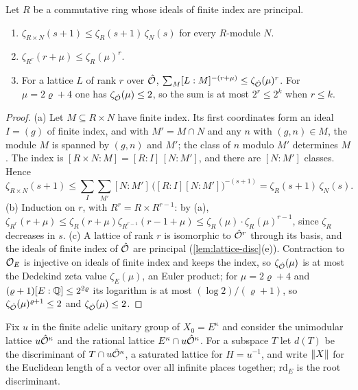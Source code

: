 \begin{lemma}\label{lem:sublattice-zeta}
Let $R$ be a commutative ring whose ideals of finite index are principal.
\begin{enumerate}[label=\textup{(\alph*)}]
\item $\zeta_{R\times N}(s+1)\le\zeta_R(s+1)\,\zeta_N(s)$ for every $R$-module $N$.
\item $\zeta_{R^r}(r+\mu)\le\zeta_R(\mu)^r$.
\item For a lattice $L$ of rank $r$ over $\hat{\mathcal{O}}$, $\sum_M[L:M]^{-(r+\mu)}\le\zeta_{\hat{\mathcal{O}}}(\mu)^r$. For $\mu=2\varrho+4$ one has $\zeta_{\hat{\mathcal{O}}}(\mu)\le2$, so the sum is at most $2^r\le2^k$ when $r\le k$.
\end{enumerate}
\end{lemma}

\begin{proof}
(a) Let $M\subseteq R\times N$ have finite index. Its first coordinates form an ideal $I=(g)$ of finite index, and with $M'=M\cap N$ and any $n$ with $(g,n)\in M$, the module $M$ is spanned by $(g,n)$
and $M'$; the class of $n$ modulo $M'$ determines $M$. The index is $[R\times N:M]=[R:I]\,[N:M']$, and there are $[N:M']$ classes. Hence
\[
  \zeta_{R\times N}(s+1)\le\sum_I\sum_{M'}[N:M']\,\bigl([R:I][N:M']\bigr)^{-(s+1)}=\zeta_R(s+1)\,\zeta_N(s).
\]
(b) Induction on $r$, with $R^r=R\times R^{r-1}$: by (a), $\zeta_{R^r}(r+\mu)\le\zeta_R(r+\mu)\zeta_{R^{r-1}}(r-1+\mu)\le\zeta_R(\mu)\cdot\zeta_R(\mu)^{r-1}$, since $\zeta_R$ decreases in $s$.
(c) A lattice of rank $r$ is isomorphic to $\hat{\mathcal{O}}^r$ through its basis, and the ideals of finite index of $\hat{\mathcal{O}}$ are principal (\cref{lem:lattice-disc}(e)). Contraction to $\mathcal{O}_E$ is injective on ideals
of finite index and keeps the index, so $\zeta_{\hat{\mathcal{O}}}(\mu)$ is at most the Dedekind zeta value $\zeta_E(\mu)$, an Euler product; for $\mu=2\varrho+4$ and $(\varrho+1)[E:\mathbb{Q}]\le2^{2\varrho}$ its logarithm
is at most $(\log2)/(\varrho+1)$, so $\zeta_{\hat{\mathcal{O}}}(\mu)^{\varrho+1}\le2$ and $\zeta_{\hat{\mathcal{O}}}(\mu)\le2$.
\end{proof}

Fix $u$ in the finite adelic unitary group of $X_0=E^\kappa$ and consider the unimodular lattice $u\hat{\mathcal{O}}^\kappa$ and the rational lattice $E^\kappa\cap u\hat{\mathcal{O}}^\kappa$. For a subspace $T$ let $d(T)$ be the
discriminant of $T\cap u\hat{\mathcal{O}}^\kappa$, a saturated lattice for $H=u^{-1}$, and write $\lVert X\rVert$ for the Euclidean length of a vector over all infinite places together; $\mathrm{rd}_E$ is the root
discriminant.

